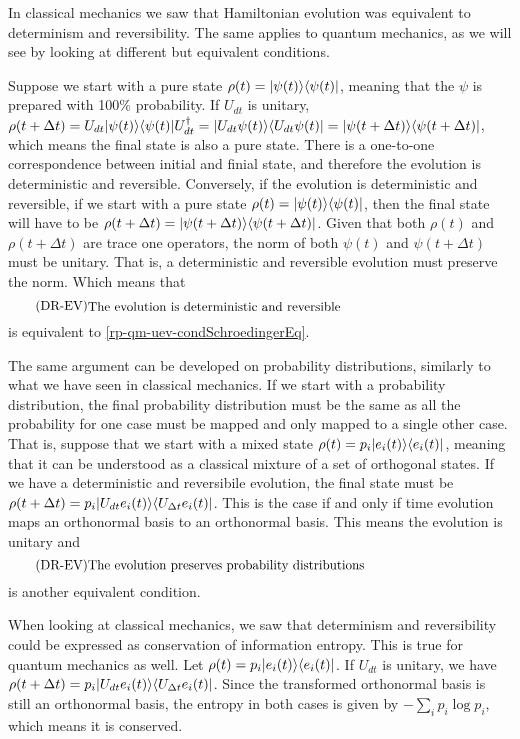 In classical mechanics we saw that Hamiltonian evolution was equivalent to determinism and reversibility. The same applies to quantum mechanics, as we will see by looking at different but equivalent conditions.

Suppose we start with a pure state $\rho(t) = |\psi(t) \rangle \langle \psi(t)|$, meaning that the $\psi$ is prepared with 100\% probability. If $U_{dt}$ is unitary, $\rho(t+\Delta t) = U_{dt}|\psi(t) \rangle \langle \psi(t)|U_{dt}^{\dagger} = |U_{dt}\psi(t) \rangle \langle U_{dt}\psi(t)| = |\psi(t+\Delta t) \rangle \langle \psi(t+\Delta t)|$, which means the final state is also a pure state. There is a one-to-one correspondence between initial and finial state, and therefore the evolution is deterministic and reversible. Conversely, if the evolution is deterministic and reversible, if we start with a pure state $\rho(t) = |\psi(t) \rangle \langle \psi(t)|$, then the final state will have to be $\rho(t+\Delta t) = |\psi(t+\Delta t) \rangle \langle \psi(t+\Delta t)|$. Given that both $\rho(t)$ and $\rho(t + \Delta t)$ are trace one operators, the norm of both $\psi(t)$ and $\psi(t+\Delta t)$ must be unitary. That is, a deterministic and reversible evolution must preserve the norm. Which means that 
\begin{equation}\label{rp-qm-uev-condDetRev}
	\tag{DR-EV}
	\eqtext{The evolution is deterministic and reversible}
\end{equation}
is equivalent to \ref{rp-qm-uev-condSchroedingerEq}.

The same argument can be developed on probability distributions, similarly to what we have seen in classical mechanics. If we start with a probability distribution, the final probability distribution must be the same as all the probability for one case must be mapped and only mapped to a single other case. That is, suppose that we start with a mixed state $\rho(t) = p_i |e_i(t) \rangle \langle e_i(t)|$, meaning that it can be understood as a classical mixture of a set of orthogonal states. If we have a deterministic and reversibile evolution, the final state must be $\rho(t+ \Delta t) = p_i |U_{dt}e_i(t) \rangle \langle U_{\Delta t} e_i(t)|$. This is the case if and only if time evolution maps an orthonormal basis to an orthonormal basis. This means the evolution is unitary and 
\begin{equation}\label{rp-qm-uev-condProbTrans}
	\tag{DR-EV}
	\eqtext{The evolution preserves probability distributions} 
\end{equation}
is another equivalent condition.

When looking at classical mechanics, we saw that determinism and reversibility could be expressed as conservation of information entropy. This is true for quantum mechanics as well. Let $\rho(t)= p_i |e_i(t) \rangle \langle e_i(t)|$. If $U_{dt}$ is unitary, we have $\rho(t+ \Delta t) = p_i |U_{dt}e_i(t) \rangle \langle U_{\Delta t} e_i(t)|$. Since the transformed orthonormal basis is still an orthonormal basis, the entropy in both cases is given by $- \sum_i p_i \log p_i$, which means it is conserved.

